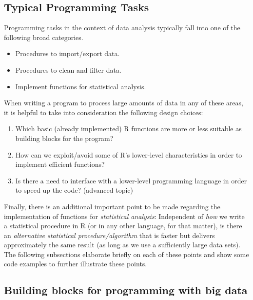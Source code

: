 \documentclass[
  12pt,
]{style/krantz}
\providecommand{\tightlist}{%
  \setlength{\itemsep}{0pt}\setlength{\parskip}{0pt}}
\begin{document}
\hypertarget{typical-programming-tasks}{%
\subsection{Typical Programming Tasks}\label{typical-programming-tasks}}

Programming tasks in the context of data analysis typically fall into one of the following broad categories.

\begin{itemize}
\tightlist
\item
  Procedures to import/export data.
\item
  Procedures to clean and filter data.
\item
  Implement functions for statistical analysis.
\end{itemize}

When writing a program to process large amounts of data in any of these areas, it is helpful to take into consideration the following design choices:

\begin{enumerate}
\def\labelenumi{\arabic{enumi}.}
\tightlist
\item
  Which basic (already implemented) R functions are more or less suitable as building blocks for the program?
\item
  How can we exploit/avoid some of R's lower-level characteristics in order to implement efficient functions?
\item
  Is there a need to interface with a lower-level programming language in order to speed up the code? (advanced topic)
\end{enumerate}

Finally, there is an additional important point to be made regarding the implementation of functions for \emph{statistical analysis}: Independent of \emph{how} we write a statistical procedure in R (or in any other language, for that matter), is there an \emph{alternative statistical procedure/algorithm} that is faster but delivers approximately the same result (as long as we use a sufficiently large data sets). The following subsections elaborate briefly on each of these points and show some code examples to further illustrate these points.

\hypertarget{building-blocks-for-programming-with-big-data}{%
\subsection{Building blocks for programming with big data}\label{building-blocks-for-programming-with-big-data}}
\end{document}
